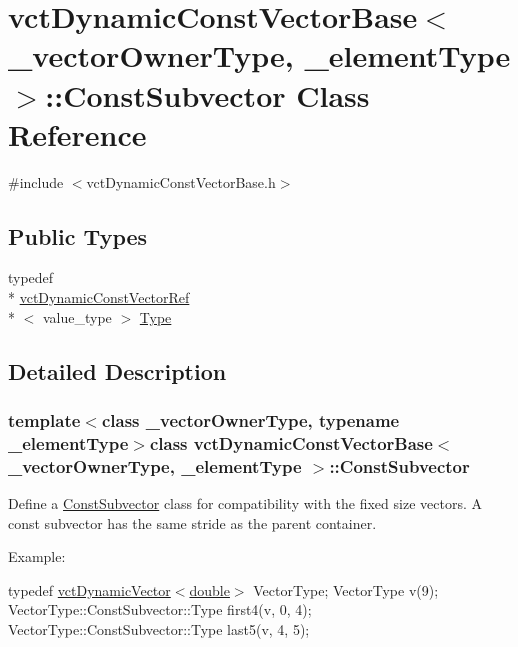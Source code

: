 \hypertarget{classvct_dynamic_const_vector_base_1_1_const_subvector}{\section{vct\-Dynamic\-Const\-Vector\-Base$<$ \-\_\-vector\-Owner\-Type, \-\_\-element\-Type $>$\-:\-:Const\-Subvector Class Reference}
\label{classvct_dynamic_const_vector_base_1_1_const_subvector}
}


{\ttfamily \#include $<$vct\-Dynamic\-Const\-Vector\-Base.\-h$>$}

\subsection*{Public Types}
\begin{DoxyCompactItemize}
\item 
typedef \\*
\hyperlink{classvct_dynamic_const_vector_ref}{vct\-Dynamic\-Const\-Vector\-Ref}\\*
$<$ value\-\_\-type $>$ \hyperlink{classvct_dynamic_const_vector_base_1_1_const_subvector_adbf4a3fe950a5909deb939cffbb7d9a5}{Type}
\end{DoxyCompactItemize}


\subsection{Detailed Description}
\subsubsection*{template$<$class \-\_\-vector\-Owner\-Type, typename \-\_\-element\-Type$>$class vct\-Dynamic\-Const\-Vector\-Base$<$ \-\_\-vector\-Owner\-Type, \-\_\-element\-Type $>$\-::\-Const\-Subvector}

Define a \hyperlink{classvct_dynamic_const_vector_base_1_1_const_subvector}{Const\-Subvector} class for compatibility with the fixed size vectors. A const subvector has the same stride as the parent container.

Example\-:

typedef \hyperlink{classvct_dynamic_vector}{vct\-Dynamic\-Vector$<$double$>$} Vector\-Type; Vector\-Type v(9); Vector\-Type\-::\-Const\-Subvector\-::\-Type first4(v, 0, 4); Vector\-Type\-::\-Const\-Subvector\-::\-Type last5(v, 4, 5);

